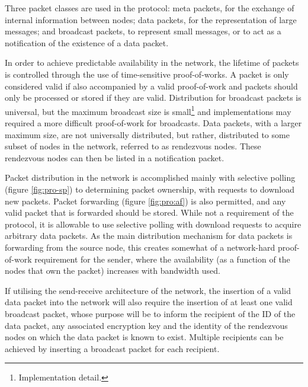 
Three packet classes are used in the protocol: meta packets, for the exchange of internal information between nodes; data packets, for the representation of large messages; and broadcast packets, to represent small messages, or to act as a notification of the existence of a data packet.

In order to achieve predictable availability in the network, the lifetime of packets is controlled through the use of time-sensitive proof-of-works. A packet is only considered valid if also accompanied by a valid proof-of-work and packets should only be processed or stored if they are valid. Distribution for broadcast packets is universal, but the maximum broadcast size is small\footnote{\label{fn:imp-detail}Implementation detail.} and implementations may required a more difficult proof-of-work for broadcasts. Data packets, with a larger maximum size, are not universally distributed, but rather, distributed to some subset of nodes in the network, referred to as rendezvous nodes. These rendezvous nodes can then be listed in a notification packet.

Packet distribution in the network is accomplished mainly with selective polling (figure \ref{fig:pro-sp}) to determining packet ownership, with requests to download new packets. Packet forwarding (figure \ref{fig:pro:af}) is also permitted, and any valid packet that is forwarded should be stored. While not a requirement of the protocol, it is allowable to use selective polling with download requests to acquire arbitrary data packets. As the main distribution mechanism for data packets is forwarding from the source node, this creates somewhat of a network-hard proof-of-work requirement for the sender, where the availability (as a function of the nodes that own the packet) increases with bandwidth used.

If utilising the send-receive architecture of the network, the insertion of a valid data packet into the network will also require the insertion of at least one valid broadcast packet, whose purpose will be to inform the recipient of the ID of the data packet, any associated encryption key and the identity of the  rendezvous nodes on which the data packet is known to exist. Multiple recipients can be achieved by inserting a broadcast packet for each recipient.

